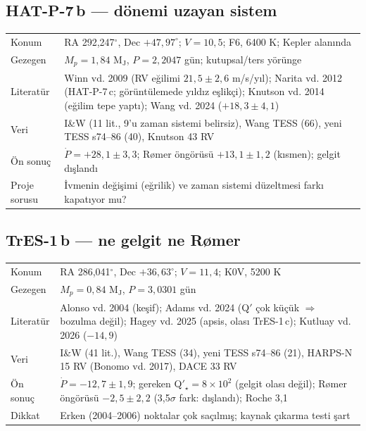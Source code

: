 \subsection*{HAT-P-7\,b — dönemi uzayan sistem}
\begin{tabularx}{\textwidth}{@{}l>{\raggedright\arraybackslash}X}
Konum & RA 292,247$^\circ$, Dec $+47{,}97^\circ$; $V = 10{,}5$; F6, 6400 K; Kepler alanında\\
Gezegen & $M_p = 1{,}84$ M$_\mathrm{J}$, $P = 2{,}2047$ gün; kutupsal/ters yörünge\\
Literatür & Winn vd. 2009 (RV eğilimi $21{,}5\pm2{,}6$ m/s/yıl); Narita vd. 2012 (HAT-P-7\,c; görüntülemede yıldız eşlikçi);
            Knutson vd. 2014 (eğilim tepe yaptı); Wang vd. 2024 ($+18{,}3\pm4{,}1$)\\
Veri & I\&W (11 lit., 9'u zaman sistemi belirsiz), Wang TESS (66), yeni TESS s74–86 (40), Knutson 43 RV\\
Ön sonuç & $\dot P = +28{,}1\pm3{,}3$; Rømer öngörüsü $+13{,}1\pm1{,}2$ (kısmen); gelgit dışlandı\\
Proje sorusu & İvmenin değişimi (eğrilik) ve zaman sistemi düzeltmesi farkı kapatıyor mu?
\end{tabularx}

\subsection*{TrES-1\,b — ne gelgit ne Rømer}
\begin{tabularx}{\textwidth}{@{}l>{\raggedright\arraybackslash}X}
Konum & RA 286,041$^\circ$, Dec $+36{,}63^\circ$; $V = 11{,}4$; K0V, 5200 K\\
Gezegen & $M_p = 0{,}84$ M$_\mathrm{J}$, $P = 3{,}0301$ gün\\
Literatür & Alonso vd. 2004 (keşif); Adams vd. 2024 (Q$'$ çok küçük $\Rightarrow$ bozulma değil); Hagey vd. 2025 (apsis,
            olası TrES-1\,c); Kutluay vd. 2026 ($-14{,}9$)\\
Veri & I\&W (41 lit.), Wang TESS (34), yeni TESS s74–86 (21), HARPS-N 15 RV (Bonomo vd. 2017), DACE 33 RV\\
Ön sonuç & $\dot P = -12{,}7\pm1{,}9$; gereken Q$'_\star = 8\times10^2$ (gelgit olası değil); Rømer öngörüsü $-2{,}5\pm2{,}2$ (3,5$\sigma$ fark: dışlandı); Roche 3,1\\
Dikkat & Erken (2004–2006) noktalar çok saçılmış; kaynak çıkarma testi şart
\end{tabularx}

